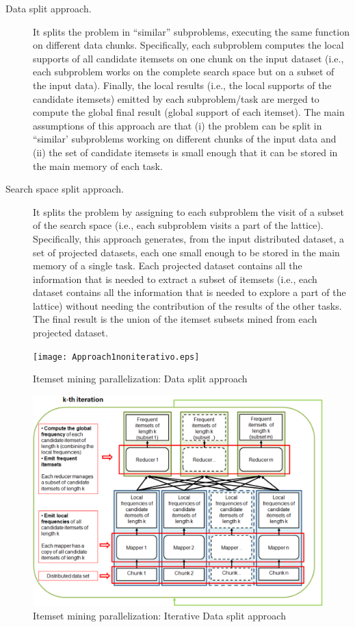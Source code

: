 \documentclass[preprint,review,12pt]{elsarticle}
\begin{document}
\begin{description}

\item[Data split approach.]  It splits the problem in ``similar'' subproblems, executing the same function on different data chunks. Specifically, each subproblem computes the local supports of all candidate itemsets on one chunk on the input dataset (i.e., each subproblem works on the complete search space but on a subset of the input data). Finally, the local results (i.e., the local supports of the candidate itemsets) emitted by each subproblem/task are merged to compute the global final result (global support of each itemset). The main assumptions of this approach are that (i) the problem can be split in ``similar' subproblems working on different chunks of the input data and (ii) the set of candidate itemsets is small enough that it can be stored in the main memory of each task.

\item[Search space split approach.]  It splits the problem by assigning to each subproblem the visit of a subset of the search space (i.e., each subproblem visits a part of the lattice). Specifically, this approach generates, from the input distributed dataset, a set of projected datasets, each one small enough to be stored in the main memory of a single task. Each projected dataset contains all the information that is needed to extract a subset of itemsets (i.e., each dataset contains all the information that is needed to explore a part of the lattice) without needing the contribution of the results of the other tasks. The final result is the union of the itemset subsets mined from each projected dataset.

\end{description}


\begin{figure}[!t]
\texttt{[image: Approach1noniterativo.eps]}
\caption{Itemset mining parallelization: Data split approach}
\label{approach1noniterativo}
\end{figure}

\begin{figure}[!t]
\includegraphics[width=5in]{Approach1.eps}
\caption{Itemset mining parallelization: Iterative Data split approach}
\label{approach1}
\end{figure}
\end{document}
